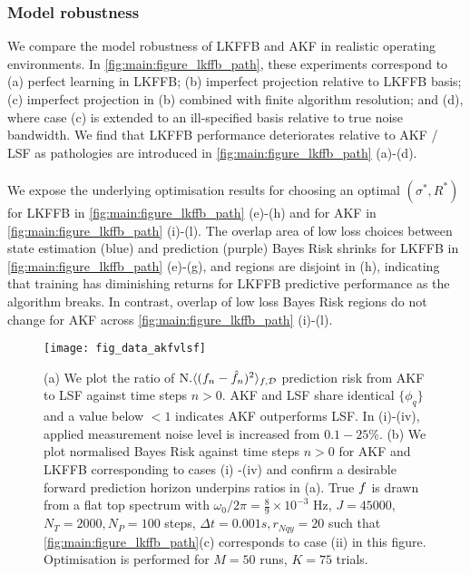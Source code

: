 \subsubsection{Model robustness}
We compare the model robustness of LKFFB and AKF in realistic operating environments. In \cref{fig:main:figure_lkffb_path}, these experiments correspond to (a) perfect learning in LKFFB; (b) imperfect projection relative to LKFFB basis; (c) imperfect projection in (b) combined with finite algorithm resolution; and (d), where case (c)  is extended to an ill-specified basis relative to true noise bandwidth. We find that LKFFB performance deteriorates relative to AKF / LSF as pathologies are introduced in \cref{fig:main:figure_lkffb_path} (a)-(d). 
\\
\\
We expose the underlying optimisation results for choosing an optimal $(\sigma^*, R^*)$ for LKFFB in \cref{fig:main:figure_lkffb_path} (e)-(h) and for AKF in \cref{fig:main:figure_lkffb_path} (i)-(l). The overlap area of low loss choices between state estimation (blue) and prediction (purple) Bayes Risk shrinks for LKFFB in \cref{fig:main:figure_lkffb_path} (e)-(g), and regions are disjoint in (h), indicating that training has diminishing returns for LKFFB predictive performance as the algorithm breaks. In contrast, overlap of low loss Bayes Risk regions do not change for AKF across \cref{fig:main:figure_lkffb_path} (i)-(l).

\begin{figure}
    \texttt{[image: fig\_data\_akfvlsf]}
    \caption{\label{fig:main:fig_data_akfvlsf} (a) We plot the ratio of $\text{N.} \langle (f_n - \hat{f}_n)^2 \rangle_{f, \mathcal{D}}$ prediction risk from AKF to LSF against time steps $n>0$.  AKF and LSF share identical $\{ \phi_q \}$ and  a value below $<1$ indicates AKF outperforms LSF. In (i)-(iv), applied measurement noise level is increased from $0.1 - 25 \%$. (b) We plot normalised Bayes Risk against time steps $n>0$ for AKF and LKFFB corresponding to cases (i) -(iv) and confirm a desirable forward prediction horizon underpins ratios in (a). True $f$ is drawn from a flat top spectrum with $\omega_0 / 2\pi = \frac{8}{9} \times 10^{-3}$ Hz, $J = 45000$, $N_T = 2000, N_P = 100$ steps, $\Delta t = 0.001s, r_{Nqy}=20$ such that \cref{fig:main:figure_lkffb_path}(c) corresponds to case (ii) in this figure. Optimisation is performed for $M=50$ runs, $K=75$ trials.}
\end{figure}

